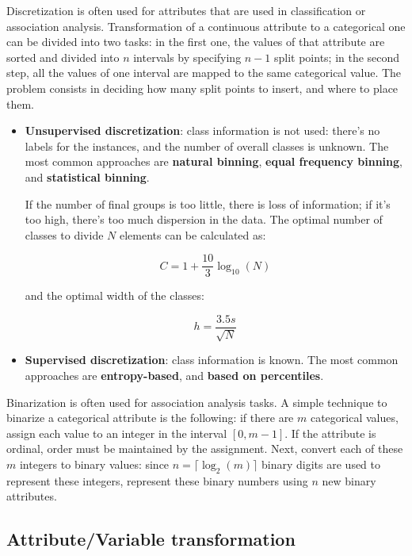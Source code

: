 Discretization is often used for attributes that are used in classification or association analysis. Transformation of a continuous attribute to a categorical one can be divided into two tasks: in the first one, the values of that attribute are sorted and divided into $n$ intervals by specifying $n-1$ split points; in the second step, all the values of one interval are mapped to the same categorical value. The problem consists in deciding how many split points to insert, and where to place them.
\begin{itemize}
    \item \textbf{Unsupervised discretization}: class information is not used: there's no labels for the instances, and the number of overall classes is unknown. The most common approaches are \textbf{natural binning}, \textbf{equal frequency binning}, and \textbf{statistical binning}.

    If the number of final groups is too little, there is loss of information; if it's too high, there's too much dispersion in the data. The optimal number of classes to divide $N$ elements can be calculated as:

    \begin{equation*}
        C = 1 + \dfrac{10}{3}\log_{10}(N)
    \end{equation*}

    and the optimal width of the classes:

    \begin{equation*}
        h = \dfrac{3.5 s}{\sqrt{N}}
    \end{equation*}

    \item \textbf{Supervised discretization}: class information is known. The most common approaches are \textbf{entropy-based}, and \textbf{based on percentiles}.
\end{itemize}

Binarization is often used for association analysis tasks. A simple technique to binarize a categorical attribute is the following: if there are $m$ categorical values, assign each value to an integer  in the interval $[0, m-1]$. If the attribute is ordinal, order must be maintained by the assignment. Next, convert each of these $m$ integers to binary values: since $n = \lceil \log_2(m) \rceil$ binary digits are used to represent these integers, represent these binary numbers using $n$ new binary attributes.

\subsection{Attribute/Variable transformation}

